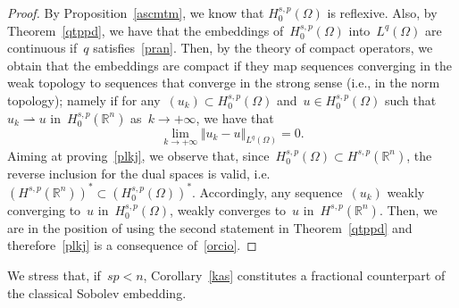 \documentclass[11pt,hyp,]{nyjm}
\numberwithin{equation}{section}
\newcommand{\R}{\mathbb{R}}
\theoremstyle{remark}
\begin{document}
		\begin{proof}
		By Proposition~\ref{ascmtm}, we know that $H^{s,p}_0(\Omega)$ is reflexive. Also, by
		Theorem~\ref{qtppd}, we have that the embeddings of~$H_0^{s,p}(\Omega)$ into~$ L^q(\Omega)$ are continuous if~$q$ satisfies~\eqref{pran}. Then, by the theory of compact operators, we obtain that the embeddings are compact if they  map sequences converging in the weak topology to sequences that converge in the strong sense (i.e., in the norm topology); namely if for any~$(u_k)\subset H_0^{s,p}(\Omega)$ and~$u\in H_0^{s,p}(\Omega) $ such that~$u_k \rightharpoonup u$ in~$H^{s,p}_0(\R^n)$ as~$k\to+\infty$, we have that
\begin{equation}\label{plkj}\lim_{k\to+\infty}
\Vert u_k - u \Vert_{L^q(\Omega)}= 0.
\end{equation}		 
	Aiming at proving~\eqref{plkj}, we observe that, since~$H^{s,p}_0(\Omega) \subset H^{s,p}(\R^n)$, the reverse inclusion for the dual spaces is valid, i.e.~$\left(H^{s,p}(\R^n)\right)^*  \subset \left(  H^{s,p}_0(\Omega) \right) ^*$. Accordingly, any sequence~$(u_k)$ weakly converging to~$u$ in~$ H^{s,p}_0(\Omega)$, weakly converges to~$u$ in~$H^{s,p}(\R^n)$. Then,
	we are in the position of using the second statement in Theorem~\ref{qtppd} and therefore~\eqref{plkj} is a consequence of~\eqref{orcio}.
		\end{proof}
	
		We stress that, if~$sp<n$, Corollary~\ref{kas} constitutes a fractional counterpart of the classical Sobolev embedding.		
\end{document}
